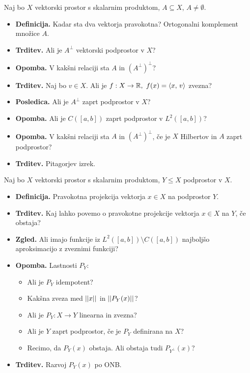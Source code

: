 \begin{enumerate}
    Naj bo \(X\) vektorski prostor s skalarnim produktom, \(A \subseteq X\), \(A \neq \emptyset\).
    \begin{itemize}
        \item \textbf{Definicija.} Kadar sta dva vektorja pravokotna? Ortogonalni komplement množice \(A\).
        \item \textbf{Trditev.} Ali je \(A^\perp\) vektorski podprostor v \(X\)?
        \item \textbf{Opomba.} V kakšni relaciji sta \(A\) in \((A^\perp)^\perp\)?
        \item \textbf{Trditev.} Naj bo \(v \in X\). Ali je \(f: X \to \mathbb{R}, \ f(x) = \left\langle x, \, v \right\rangle\) zvezna?
        \item \textbf{Posledica.} Ali je \(A^\perp\) zaprt podprostor v \(X\)?
        \item \textbf{Opomba.} Ali je \(C([a, b])\) zaprt podprostor v \(L^2([a,b])\)?
        \item \textbf{Opomba.} V kakšni relaciji sta \(A\) in \((A^\perp)^\perp\), če je \(X\) Hilbertov in \(A\) zaprt podprostor?
        \item \textbf{Trditev.} Pitagorjev izrek.
    \end{itemize}
    \newpage
    Naj bo \(X\) vektorski prostor s skalarnim produktom, \(Y \leq X\) podprostor v \(X\).
    \begin{itemize}
        \item \textbf{Definicija.} Pravokotna projekcija vektorja \(x \in X\) na podprostor \(Y\).
        \item \textbf{Trditev.} Kaj lahko povemo o pravokotne projekcije vektorja \(x \in X\) na \(Y\), če obstaja?
        \item \textbf{Zgled.} Ali imajo funkcije iz \(L^2([a, b]) \setminus C([a, b])\) najboljšo aproksimacijo z zveznimi funkciji?
        \item \textbf{Opomba.} Lastnosti \(P_Y\):
        \begin{itemize}
            \item Ali je \(P_Y\) idempotent?
            \item Kakšna zveza med \(||x||\) in \(||P_Y(x)||\)?
            \item Ali je \(P_Y: X \to Y\) linearna in zvezna?
            \item Ali je \(Y\) zaprt podprostor, če je \(P_Y\) definirana na \(X\)?
            \item Recimo, da \(P_Y(x)\) obstaja. Ali obstaja tudi \(P_{Y^\perp}(x)\)?
        \end{itemize}
        \item \textbf{Trditev.} Razvoj \(P_Y(x)\) po ONB.
    \end{itemize}
\end{enumerate}